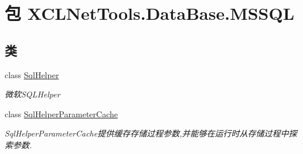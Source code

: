 \hypertarget{namespace_x_c_l_net_tools_1_1_data_base_1_1_m_s_s_q_l}{\section{包 X\-C\-L\-Net\-Tools.\-Data\-Base.\-M\-S\-S\-Q\-L}
\label{namespace_x_c_l_net_tools_1_1_data_base_1_1_m_s_s_q_l}
}
\subsection*{类}
\begin{DoxyCompactItemize}
\item 
class \hyperlink{class_x_c_l_net_tools_1_1_data_base_1_1_m_s_s_q_l_1_1_sql_helper}{Sql\-Helper}
\begin{DoxyCompactList}\small\item\em 微软\-S\-Q\-L\-Helper \end{DoxyCompactList}\item 
class \hyperlink{class_x_c_l_net_tools_1_1_data_base_1_1_m_s_s_q_l_1_1_sql_helper_parameter_cache}{Sql\-Helper\-Parameter\-Cache}
\begin{DoxyCompactList}\small\item\em Sql\-Helper\-Parameter\-Cache提供缓存存储过程参数,并能够在运行时从存储过程中探索参数. \end{DoxyCompactList}\end{DoxyCompactItemize}

